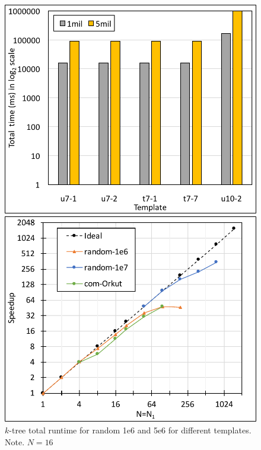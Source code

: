 \begin{figure}[!htb]
    \centering
    \begin{minipage}{0.32\textwidth}
        \centering        
        \includegraphics[width=1\columnwidth]{img/ktree/ktree-1mil-5mil-16nodes.png}
        \caption{$k$-tree total runtime for random 1e6 and 5e6 for different templates. Note. $N=16$}
        \label{fig:ktree-1mil-5mil-16nodes.png}
    \end{minipage}
    \hspace{0mm}
    \begin{minipage}{0.32\textwidth}
        \centering        
        \includegraphics[width=1\textwidth]{img/fig-perf-scan-speedup-N=N1.pdf}

\end{minipage}
\end{figure}
